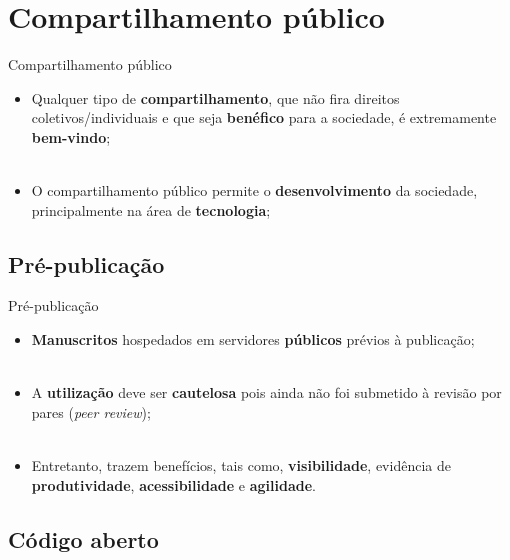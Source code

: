 \section{Compartilhamento público}
\label{s.public_sharing}

\begin{frame}{Compartilhamento público}
	\justify
	\begin{itemize}
		\item<1> Qualquer tipo de \textbf{compartilhamento}, que não fira direitos coletivos/individuais e que seja \textbf{benéfico} para a sociedade, é extremamente \textbf{bem-vindo};
		\\~\\
		\item<2> O compartilhamento público permite o \textbf{desenvolvimento} da sociedade, principalmente na área de \textbf{tecnologia};
	\end{itemize}
\end{frame}

\subsection{Pré-publicação}
\label{ss.preprint}

\begin{frame}{Pré-publicação}
	\justify
	\begin{itemize}
		\item<1> \textbf{Manuscritos} hospedados em servidores \textbf{públicos} prévios à publicação;
		\\~\\
		\item<2> A \textbf{utilização} deve ser \textbf{cautelosa} pois ainda não foi submetido à revisão por pares (\emph{peer review});
		\\~\\
		\item<3> Entretanto, trazem benefícios, tais como, \textbf{visibilidade}, evidência de \textbf{produtividade}, \textbf{acessibilidade} e \textbf{agilidade}.
	\end{itemize}
\end{frame}

\subsection{Código aberto}
\label{ss.open_source}

